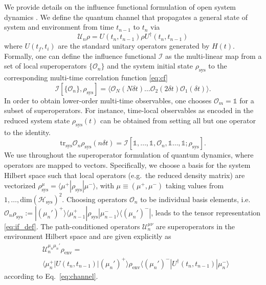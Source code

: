 \documentclass[aps,prb, twocolumn,superscriptaddress]{revtex4-2}
\newcommand{\id}{\mathbb{1}}
\newcommand{\braket}[1]{\langle#1\rangle}
\newcommand{\ketbra}[2]{|#1\rangle\!\langle #2|}
\newcommand{\tr}{\mathrm{tr}}
\begin{document}
We provide details on the influence functional  formulation of open system dynamics \cite{keeling2025Process}. We define the quantum channel that propagates a general state of system and environment from time $t_{n-1}$ to $t_{n}$ via
\begin{equation}\label{eq:channel}
    \mathcal{U}_n\rho=U(t_{n},t_{n-1})\rho U^\dagger(t_{n},t_{n-1})
\end{equation}
where $U(t_f,t_i)$ are the standard unitary operators generated by $H(t)$. Formally, one can define the influence functional $\mathcal{I}$ as the multi-linear map from a set of local superoperators $\{\mathcal{O}_n\}$ and the system initial state $\rho_\mathrm{sys}$ to the corresponding multi-time correlation function \eqref{eq:cf}
\begin{equation}
    \mathcal{I}[\{\mathcal{O}_n\},\rho_\mathrm{sys}]=\braket{\mathcal{O}_N(N\delta t)\ldots \mathcal{O}_2(2\delta t) \mathcal{O}_1(\delta t)}.
\end{equation}
In order to obtain lower-order multi-time observables, one chooses $\mathcal{O}_m=\id$ for a subset of superoperators. For instance, time-local observables as encoded in the reduced system state $\rho_\mathrm{sys}(t)$ can be obtained from setting all but one operator to the identity.
\begin{equation}
    \tr_\mathrm{sys} \mathcal{O}_n\rho_\mathrm{sys}(n\delta t)=\mathcal{I}[\id,\ldots ,\id,\mathcal{O}_n,\id\ldots,\id;\rho_\mathrm{sys} ].
\end{equation}
We use throughout the superoperator formulation of quantum dynamics, where operators are mapped to vectors. Specifically, we choose a basis for the system Hilbert space such that local operators (e.g.~the reduced density matrix) are vectorized $\rho_\mathrm{sys}^\mu=\braket{\mu^+|\rho_\mathrm{sys}|\mu^-}$, with $\mu\equiv(\mu^+,\mu^-)$ taking values from $1,\ldots ,\mathrm{dim}(\mathcal{H}_\mathrm{sys})^2$.
Choosing operators $\mathcal{O}_n$ to be individual basis elements, i.e.~$\mathcal{O}_n\rho_\mathrm{sys}:=\ketbra{(\mu_n')^{+} }{\mu_{n-1}^{+}}\rho_\mathrm{sys}\ketbra{\mu_{n-1}^{-} }{(\mu_n')^{-}}$, leads to the tensor representation \eqref{eq:if_def}. The path-conditioned operators $\mathcal{U}_n^{\mu\nu}$ are superoperators in the environment Hilbert space and are given explicitly as
\begin{equation}
    \begin{split}
&\mathcal{U}^{\mu_n\mu_n'}_n\rho_\mathrm{env}=\\&\braket{\mu_n^+|U(t_{n},t_{n-1})|(\mu_n')^+}\rho_\mathrm{env}\braket{(\mu_n')^-|U^\dagger(t_{n},t_{n-1})|\mu^-_n}
\end{split}
\end{equation}
according to Eq.~\eqref{eq:channel}.
\end{document}
